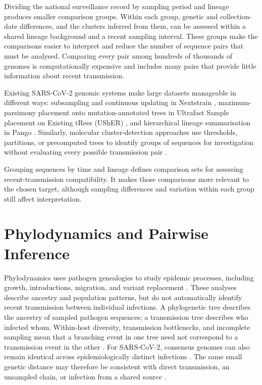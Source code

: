 Dividing the national surveillance record by sampling period and lineage produces smaller comparison groups. Within each group, genetic and collection-date differences, and the clusters inferred from them, can be assessed within a shared lineage background and a recent sampling interval. These groups make the comparisons easier to interpret and reduce the number of sequence pairs that must be analysed. Comparing every pair among hundreds of thousands of genomes is computationally expensive and includes many pairs that provide little information about recent transmission.

Existing SARS-CoV-2 genomic systems make large datasets manageable in different ways: subsampling and continuous updating in Nextstrain \citep{Hadfield2018}, maximum-parsimony placement onto mutation-annotated trees in Ultrafast Sample placement on Existing tRees (UShER) \citep{Turakhia2021}, and hierarchical lineage summarisation in Pango \citep{Rambaut2020,OToole2021}. Similarly, molecular cluster-detection approaches use thresholds, partitions, or precomputed trees to identify groups of sequences for investigation without evaluating every possible transmission pair \citep{Prosperi2011,Balaban2019,Gamza2024}.

Grouping sequences by time and lineage defines comparison sets for assessing recent-transmission compatibility. It makes those comparisons more relevant to the chosen target, although sampling differences and variation within each group still affect interpretation.

\section{Phylodynamics and Pairwise Inference}\label{sec:ch2_common_approaches}

Phylodynamics uses pathogen genealogies to study epidemic processes, including growth, introductions, migration, and variant replacement \citep{Grenfell2004,Pybus2013,Volz2013,Lemey2009,Faria2011,Suchard2018}. These analyses describe ancestry and population patterns, but do not automatically identify recent transmission between individual infections. A phylogenetic tree describes the ancestry of sampled pathogen sequences; a transmission tree describes who infected whom. Within-host diversity, transmission bottlenecks, and incomplete sampling mean that a branching event in one tree need not correspond to a transmission event in the other \citep{Ypma2013,Jombart2014,DeMaio2015,Didelot2017}. For SARS-CoV-2, consensus genomes can also remain identical across epidemiologically distinct infections \citep{Valesano2021,Lythgoe2021,Bendall2022,Farjo2023}. The same small genetic distance may therefore be consistent with direct transmission, an unsampled chain, or infection from a shared source \citep{Louca2021}.

